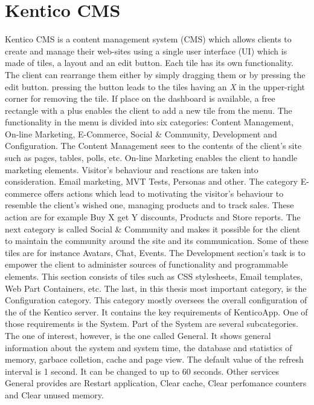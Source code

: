 \section{Kentico CMS} \label{analysisKenticoCMS}
Kentico CMS is a content management system (CMS) which allows clients to create and manage their web-sites using a single user interface (UI) which is made of tiles, a layout and an edit button. Each tile has its own functionality. The client can rearrange them either by simply dragging them or by pressing the edit button. pressing the button leads to the tiles having an \textit{X} in the upper-right corner for removing the tile. If place on the dashboard is available, a free rectangle with a plus enables the client to add a new tile from the menu. The functionality in the menu is divided into six categories: Content Management, On-line Marketing, E-Commerce, Social \& Community, Development and Configuration. The Content Management sees to the contents of the client's site such as pages, tables, polls, etc. On-line Marketing enables the client to handle marketing elements. Visitor's behaviour and reactions are taken into consideration. Email marketing, MVT Tests, Personas and other. The category E-commerce offers actions which lead to motivating the visitor's behaviour to resemble the client's wished one, managing products and to track sales. These action are for example Buy X get Y discounts, Products and Store reports. The next category is called Social \& Community and makes it possible for the client to maintain the community around the site and its communication. Some of these tiles are for instance Avatars, Chat, Events. The Development section's task is to empower the client to administer sources of functionality and programmable elements. This section consists of tiles such as CSS stylesheets, Email templates, Web Part Containers, etc. The last, in this thesis most important category, is the Configuration category. This category mostly oversees the overall configuration of the of the Kentico server. It contains the key requirements of KenticoApp. 
One of those requirements is the System. Part of the System are several subcategories. The one of interest, however, is the one called General. It shows general information about the system and system time, the database and statistics of memory, garbace colletion, cache and page view. The default value of the refresh interval is 1 second. It can be changed to up to 60 seconds. Other services General provides are Restart application, Clear cache, Clear perfomance counters and Clear unused memory. 
